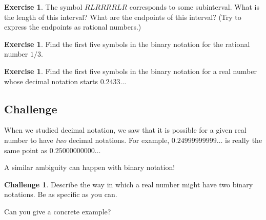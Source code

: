 \documentclass[12pt,letterpaper]{article}
\theoremstyle{definition}
\newtheorem{exercise}[question]{Exercise}
\newtheorem*{challenge}{Challenge}
\begin{document}
\begin{exercise}
The symbol $RLRRRRLR$ corresponds to some subinterval.
What is the length of this interval?
What are the endpoints of this interval?
(Try to express the endpoints as rational numbers.)
\end{exercise}

\begin{exercise}
Find the first five symbols in the binary notation for the rational number $1/3$.
\end{exercise}

\begin{exercise}
Find the first five symbols in the binary notation for a real number whose decimal notation starts
$0.2433\ldots$
\end{exercise}


\subsection*{Challenge}

When we studied decimal notation, we saw that it is possible for a given real number to have \emph{two} decimal notations.
For example, $0.24999999999\ldots$ is really the same point as $0.25000000000\ldots$

A similar ambiguity can happen with binary notation!

\begin{challenge}
Describe the way in which a real number might have two binary notations.
Be as specific as you can.

Can you give a concrete example?
\end{challenge}



\end{document}
